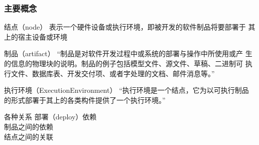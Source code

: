 \documentclass[compress]{beamer}
\begin{document}
\begin{frame}
  \frametitle{主要概念}
   {
  \begin{block}{结点（node）}
    表示一个硬件设备或执行环境，即被开发的软件制品将要部署于
  其上的宿主设备或环境  
\end{block}

  \begin{block}{制品（artifact）}
    “制品是对软件开发过程中或系统的部署与操作中所使用或产
  生的信息的物理块的说明。制品的例子包括模型文件、源文件、草稿、二进制可
  执行文件、数据库表、开发交付项、或者字处理的文档、邮件消息等。”  
\end{block}
  }

   {
    \begin{block}{执行环境（ExecutionEnvironment）}
      “执行环境是一个结点，它为以可执行制品
  的形式部署于其上的各类构件提供了一个执行环境。”  
\end{block}

  \begin{block}{各种关系} 
  部署（deploy）依赖 \\
  制品之间的依赖 \\
  结点之间的关联
  \end{block}
  }
\end{frame}
\end{document}

